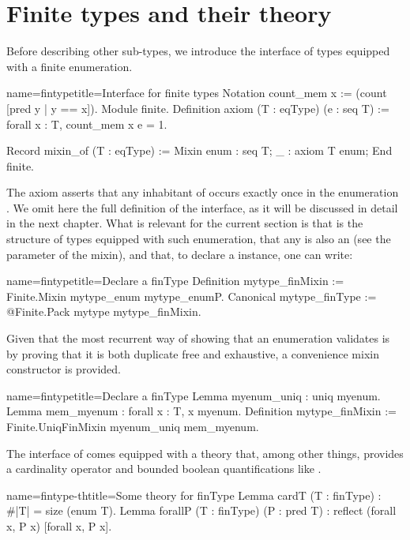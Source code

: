 \section{Finite types and their theory}

Before describing other sub-types, we introduce the interface of
types equipped with a finite enumeration.

\begin{coq}{name=fintype}{title=Interface for finite types}
Notation count_mem x := (count [pred y | y == x]).
Module finite.
Definition axiom (T : eqType) (e : seq T) :=
  forall x : T, count_mem x e = 1.

Record mixin_of (T : eqType) := Mixin {
  enum : seq T;
  _ : axiom T enum;
}
End finite.
\end{coq}

The axiom asserts that any inhabitant of  occurs exactly once
in the enumeration .  We omit here the full definition of the
interface, as it will be discussed in detail in the next chapter.
What is relevant for the current section is that  is the
structure of types equipped with such enumeration, that any 
is also an  (see the parameter of the mixin), and that,
to declare a  instance, one can write:

\begin{coq}{name=fintype}{title=Declare a finType}
Definition mytype_finMixin := Finite.Mixin mytype_enum mytype_enumP.
Canonical mytype_finType := @Finite.Pack mytype mytype_finMixin.
\end{coq}

Given that the most recurrent way of showing that an enumeration
validates  is by proving that it is both duplicate free
and exhaustive, a convenience mixin constructor is provided.

\begin{coq}{name=fintype}{title=Declare a finType}
Lemma myenum_uniq : uniq myenum.
Lemma mem_myenum : forall x : T, x \in myenum.
Definition mytype_finMixin := Finite.UniqFinMixin myenum_uniq mem_myenum.
\end{coq}

The interface of  comes equipped with a theory that, among
other things, provides a cardinality operator  and bounded
boolean quantifications like \C{[forall x, P]}.

\begin{coq}{name=fintype-th}{title=Some theory for finType}
Lemma cardT (T : finType) : #|T| = size (enum T).
Lemma forallP (T : finType) (P : pred T) : reflect (forall x, P x) [forall x, P x].
\end{coq}

